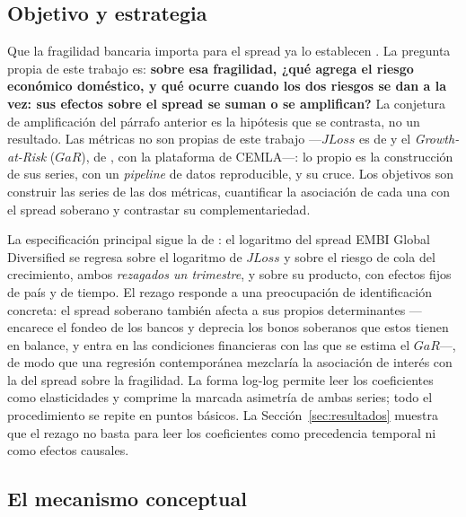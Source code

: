 \subsection{Objetivo y estrategia}

Que la fragilidad bancaria importa para el spread ya lo establecen \citet{Chari2024b}. La pregunta propia de este trabajo es: \textbf{sobre esa fragilidad, ¿qué agrega el riesgo económico doméstico, y qué ocurre cuando los dos riesgos se dan a la vez: sus efectos sobre el spread se suman o se amplifican?} La conjetura de amplificación del párrafo anterior es la hipótesis que se contrasta, no un resultado. Las métricas no son propias de este trabajo ---$JLoss$ es de \citet{Chari2024b} y el \textit{Growth-at-Risk} ($GaR$), de \citet{ABG2019b}, con la plataforma de CEMLA---: lo propio es la construcción de sus series, con un \textit{pipeline} de datos reproducible, y su cruce. Los objetivos son construir las series de las dos métricas, cuantificar la asociación de cada una con el spread soberano y contrastar su complementariedad.

La especificación principal sigue la de \citet{Chari2024b}: el logaritmo del spread EMBI Global Diversified se regresa sobre el logaritmo de $JLoss$ y sobre el riesgo de cola del crecimiento, ambos \emph{rezagados un trimestre}, y sobre su producto, con efectos fijos de país y de tiempo. El rezago responde a una preocupación de identificación concreta: el spread soberano también afecta a sus propios determinantes ---encarece el fondeo de los bancos y deprecia los bonos soberanos que estos tienen en balance, y entra en las condiciones financieras con las que se estima el $GaR$---, de modo que una regresión contemporánea mezclaría la asociación de interés con la del spread sobre la fragilidad. La forma log-log permite leer los coeficientes como elasticidades y comprime la marcada asimetría de ambas series; todo el procedimiento se repite en puntos básicos. La Sección~\ref{sec:resultados} muestra que el rezago no basta para leer los coeficientes como precedencia temporal ni como efectos causales.

\subsection{El mecanismo conceptual}
\label{sec:mecanismo-conceptual}

